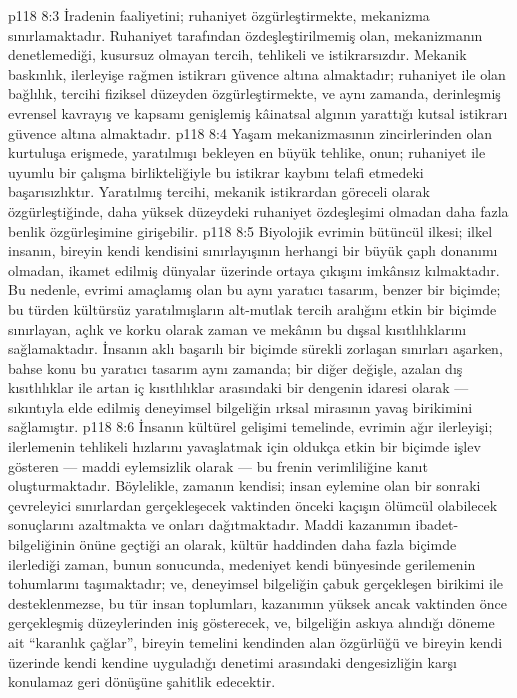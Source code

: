\vs p118 8:3 İradenin faaliyetini; ruhaniyet özgürleştirmekte, mekanizma sınırlamaktadır. Ruhaniyet tarafından özdeşleştirilmemiş olan, mekanizmanın denetlemediği, kusursuz olmayan tercih, tehlikeli ve istikrarsızdır. Mekanik baskınlık, ilerleyişe rağmen istikrarı güvence altına almaktadır; ruhaniyet ile olan bağlılık, tercihi fiziksel düzeyden özgürleştirmekte, ve aynı zamanda, derinleşmiş evrensel kavrayış ve kapsamı genişlemiş kâinatsal algının yarattığı kutsal istikrarı güvence altına almaktadır.
\vs p118 8:4 Yaşam mekanizmasının zincirlerinden olan kurtuluşa erişmede, yaratılmışı bekleyen en büyük tehlike, onun; ruhaniyet ile uyumlu bir çalışma birlikteliğiyle bu istikrar kaybını telafi etmedeki başarısızlıktır. Yaratılmış tercihi, mekanik istikrardan göreceli olarak özgürleştiğinde, daha yüksek düzeydeki ruhaniyet özdeşleşimi olmadan daha fazla benlik özgürleşimine girişebilir.
\vs p118 8:5 Biyolojik evrimin bütüncül ilkesi; ilkel insanın, bireyin kendi kendisini sınırlayışının herhangi bir büyük çaplı donanımı olmadan, ikamet edilmiş dünyalar üzerinde ortaya çıkışını imkânsız kılmaktadır. Bu nedenle, evrimi amaçlamış olan bu aynı yaratıcı tasarım, benzer bir biçimde; bu türden kültürsüz yaratılmışların alt\hyp{}mutlak tercih aralığını etkin bir biçimde sınırlayan, açlık ve korku olarak zaman ve mekânın bu dışsal kısıtlılıklarını sağlamaktadır. İnsanın aklı başarılı bir biçimde sürekli zorlaşan sınırları aşarken, bahse konu bu yaratıcı tasarım aynı zamanda; bir diğer değişle, azalan dış kısıtlılıklar ile artan iç kısıtlılıklar arasındaki bir dengenin idaresi olarak --- sıkıntıyla elde edilmiş deneyimsel bilgeliğin ırksal mirasının yavaş birikimini sağlamıştır.
\vs p118 8:6 İnsanın kültürel gelişimi temelinde, evrimin ağır ilerleyişi; ilerlemenin tehlikeli hızlarını yavaşlatmak için oldukça etkin bir biçimde işlev gösteren --- maddi eylemsizlik olarak --- bu frenin verimliliğine kanıt oluşturmaktadır. Böylelikle, zamanın kendisi; insan eylemine olan bir sonraki çevreleyici sınırlardan gerçekleşecek vaktinden önceki kaçışın ölümcül olabilecek sonuçlarını azaltmakta ve onları dağıtmaktadır. Maddi kazanımın ibadet\hyp{}bilgeliğinin önüne geçtiği an olarak, kültür haddinden daha fazla biçimde ilerlediği zaman, bunun sonucunda, medeniyet kendi bünyesinde gerilemenin tohumlarını taşımaktadır; ve, deneyimsel bilgeliğin çabuk gerçekleşen birikimi ile desteklenmezse, bu tür insan toplumları, kazanımın yüksek ancak vaktinden önce gerçekleşmiş düzeylerinden iniş gösterecek, ve, bilgeliğin askıya alındığı döneme ait “karanlık çağlar”, bireyin temelini kendinden alan özgürlüğü ve bireyin kendi üzerinde kendi kendine uyguladığı denetimi arasındaki dengesizliğin karşı konulamaz geri dönüşüne şahitlik edecektir.
